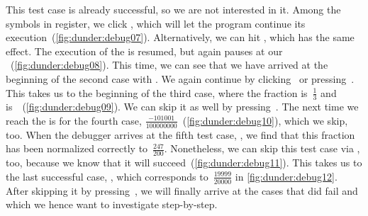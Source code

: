 This test case is already successful, so we are not interested in it.
Among the symbols in  register, we click \pycharmDebuggerResume, which will let the program continue its execution~(\cref{fig:dunder:debug07}).
Alternatively, we can hit , which has the same effect.
The execution of the  is resumed, but again pauses at our ~(\cref{fig:dunder:debug08}).
This time, we can see that we have arrived at the beginning of the second  case with .
We again continue by clicking \pycharmDebuggerResume\ or pressing~.
This takes us to the beginning of the third  case, where the fraction is~$\frac{1}{3}$ and  is~~(\cref{fig:dunder:debug09}).
We can skip it as well by pressing~.
The next time we reach the  is for the fourth  case, $\frac{-101001}{100000000}$~(\cref{fig:dunder:debug10}), which we skip, too.
When the debugger arrives at the fifth test case, , we find that this fraction has been normalized correctly to~$\frac{247}{200}$.
Nonetheless, we can skip this test case via , too, because we know that it will succeed~(\cref{fig:dunder:debug11}).
This takes us to the last successful  case, , which corresponds to~$\frac{19999}{20000}$ in \cref{fig:dunder:debug12}.
After skipping it by pressing~\pycharmDebuggerResume, we will finally arrive at the cases that did fail and which we hence want to investigate step-by-step.

